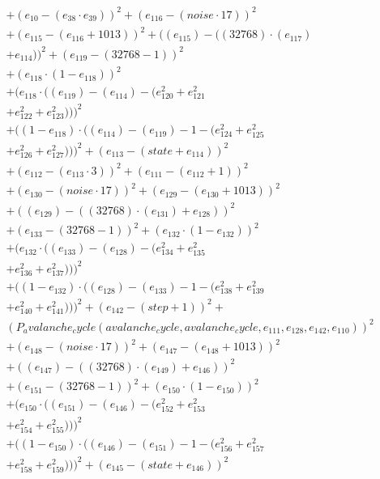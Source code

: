 \documentclass[10pt, a4paper]{article}
\begin{document}
\begin{align*}
& + (e_{10} - (e_{38}  \cdot  e_{39}))^{2} + (e_{116} - (noise  \cdot  17))^{2} \\
& + (e_{115} - (e_{116} + 1013))^{2} + ((e_{115}) - ((32768)  \cdot  (e_{117}) \\
& + e_{114}))^{2} + (e_{119} - (32768 - 1))^{2} \\
& + (e_{118}  \cdot  (1 - e_{118}))^{2} \\
& + (e_{118}  \cdot  ((e_{119}) - (e_{114}) - (e_{120}^{2} + e_{121}^{2} \\
& + e_{122}^{2} + e_{123}^{2})))^{2} \\
& + ((1 - e_{118})  \cdot  ((e_{114}) - (e_{119}) - 1 - (e_{124}^{2} + e_{125}^{2} \\
& + e_{126}^{2} + e_{127}^{2})))^{2} + (e_{113} - (state + e_{114}))^{2} \\
& + (e_{112} - (e_{113}  \cdot  3))^{2} + (e_{111} - (e_{112} + 1))^{2} \\
& + (e_{130} - (noise  \cdot  17))^{2} + (e_{129} - (e_{130} + 1013))^{2} \\
& + ((e_{129}) - ((32768)  \cdot  (e_{131}) + e_{128}))^{2} \\
& + (e_{133} - (32768 - 1))^{2} + (e_{132}  \cdot  (1 - e_{132}))^{2} \\
& + (e_{132}  \cdot  ((e_{133}) - (e_{128}) - (e_{134}^{2} + e_{135}^{2} \\
& + e_{136}^{2} + e_{137}^{2})))^{2} \\
& + ((1 - e_{132})  \cdot  ((e_{128}) - (e_{133}) - 1 - (e_{138}^{2} + e_{139}^{2} \\
& + e_{140}^{2} + e_{141}^{2})))^{2} + (e_{142} - (step + 1))^{2} + \\
& (P_avalanche_cycle(avalanche_cycle, avalanche_cycle, e_{111}, e_{128}, e_{142}, e_{110}))^{2} \\
& + (e_{148} - (noise  \cdot  17))^{2} + (e_{147} - (e_{148} + 1013))^{2} \\
& + ((e_{147}) - ((32768)  \cdot  (e_{149}) + e_{146}))^{2} \\
& + (e_{151} - (32768 - 1))^{2} + (e_{150}  \cdot  (1 - e_{150}))^{2} \\
& + (e_{150}  \cdot  ((e_{151}) - (e_{146}) - (e_{152}^{2} + e_{153}^{2} \\
& + e_{154}^{2} + e_{155}^{2})))^{2} \\
& + ((1 - e_{150})  \cdot  ((e_{146}) - (e_{151}) - 1 - (e_{156}^{2} + e_{157}^{2} \\
& + e_{158}^{2} + e_{159}^{2})))^{2} + (e_{145} - (state + e_{146}))^{2} \\

\end{align*}
\end{document}
